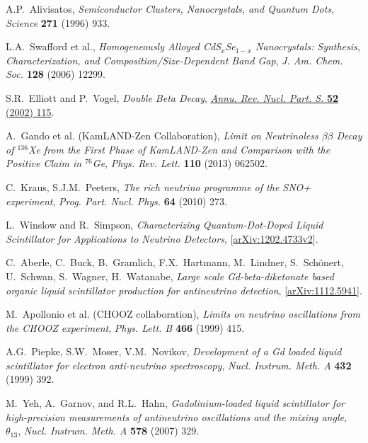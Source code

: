 \documentclass[cits]{JINST}
\begin{document}
\newpage
\begin{thebibliography}{9}

A.P.~Alivisatos, \emph{Semiconductor Clusters, Nanocrystals, and Quantum Dots}, \emph{Science} {\bf 271} (1996) 933.

L.A.~Swafford et al., \emph{Homogeneously Alloyed CdS$_{x}$Se$_{1-x}$ Nanocrystals: Synthesis, Characterization, and Composition/Size-Dependent Band Gap}, \emph{J. Am. Chem. Soc.} {\bf 128} (2006) 12299.

S.R.~Elliott and P.~Vogel, \emph{Double Beta Decay}, \href{http://www.annualreviews.org/doi/abs/10.1146/annurev.nucl.52.050102.090641}{\emph{Annu. Rev. Nucl. Part. S.} {\bf 52} (2002) 115}.

A.~Gando et al. (KamLAND-Zen Collaboration), \emph{Limit on Neutrinoless $\beta\beta$ Decay of $^{136}$Xe from the First Phase of KamLAND-Zen and Comparison with the Positive Claim in $^{76}$Ge}, \emph{Phys. Rev. Lett.} {\bf 110} (2013) 062502. 

C.~Kraus, S.J.M.~Peeters, \emph{The rich neutrino programme of the SNO+ experiment}, \emph{Prog. Part. Nucl. Phys.} {\bf 64} (2010) 273.

L.~Winslow and R.~Simpson, \emph{Characterizing Quantum-Dot-Doped Liquid Scintillator for Applications to Neutrino Detectors},  [\href{http://arxiv.org/abs/1202.4733}{arXiv:1202.4733v2}].

C.~Aberle, C.~Buck, B.~Gramlich, F.X.~Hartmann, M.~Lindner, S.~Sch\"{o}nert, U.~Schwan, S.~Wagner, H.~Watanabe, \emph{Large scale Gd-beta-diketonate based organic liquid scintillator production for antineutrino detection},  [\href{http://arxiv.org/abs/1112.5941v2}{arXiv:1112.5941}].

M.~Apollonio et al. (CHOOZ collaboration), \emph{Limits on neutrino oscillations from the CHOOZ experiment}, \emph{Phys. Lett. B} {\bf 466} (1999) 415.

A.G.~Piepke, S.W.~Moser, V.M.~Novikov, \emph{Development of a Gd loaded liquid scintillator for electron anti-neutrino spectroscopy}, \emph{Nucl. Instrum. Meth. A} {\bf 432} (1999) 392.

M.~Yeh, A.~Garnov, and R.L.~Hahn, \emph{Gadolinium-loaded liquid scintillator for high-precision measurements
of antineutrino oscillations and the mixing angle, $\theta_{13}$}, \emph{Nucl. Instrum. Meth. A} {\bf 578} (2007) 329.


\end{thebibliography}
\end{document}
